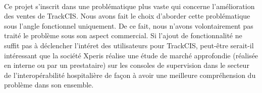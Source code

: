 	\paragraph{}
	Ce projet s'inscrit dans une problématique plus
	vaste qui concerne l'amélioration des ventes de TrackCIS. Nous avons fait le
	choix d'aborder cette problématique sous l'angle fonctionnel uniquement. De ce
	fait, nous n'avons volontairement pas traité le problème sous son aspect
	commercial. Si l'ajout de fonctionnalité ne suffit pas à déclencher l'intéret
	des utilisateurs pour TrackCIS, peut-être serait-il intéressant que la
	société Xperis réalise une étude de marché approfondie (réalisée en interne ou
	par un prestataire) sur les consoles de supervision dans le secteur de
	l'interopérabilité hospitalière de façon à avoir une meilleure compréhension
	du problème dans son ensemble.
